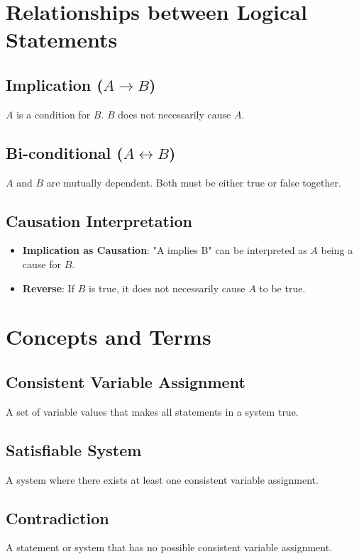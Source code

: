 \documentclass{article}
\begin{document}
\section{Relationships between Logical Statements}

\subsection{Implication ($A \rightarrow B$)}
$A$ is a condition for $B$. $B$ does not necessarily cause $A$.

\subsection{Bi-conditional ($A \leftrightarrow B$)}
$A$ and $B$ are mutually dependent. Both must be either true or false together.

\subsection{Causation Interpretation}
\begin{itemize}
    \item \textbf{Implication as Causation}: "A implies B" can be interpreted as $A$ being a cause for $B$.
    \item \textbf{Reverse}: If $B$ is true, it does not necessarily cause $A$ to be true.
\end{itemize}

\section{Concepts and Terms}

\subsection{Consistent Variable Assignment}
A set of variable values that makes all statements in a system true.

\subsection{Satisfiable System}
A system where there exists at least one consistent variable assignment.

\subsection{Contradiction}
A statement or system that has no possible consistent variable assignment.
\end{document}
